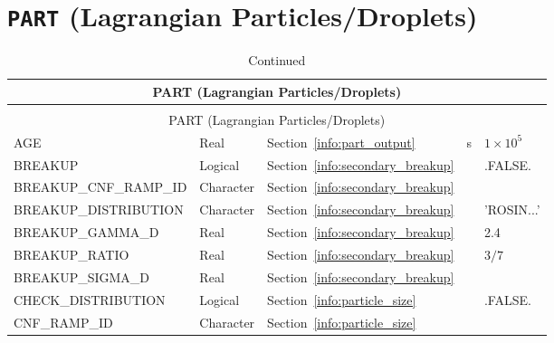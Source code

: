 \documentclass[11pt]{book}
\begin{document}
\vspace{\baselineskip}


\section{\texorpdfstring{{\tt PART}}{PART} (Lagrangian Particles/Droplets)}


\begin{longtable}{@{\extracolsep{\fill}}|l|l|l|l|l|}
\caption[Lagrangian particles ({\ct PART} namelist group)]{For more information see Chapter~\ref{info:PART}.}
\label{tbl:PART} \\
\hline
\multicolumn{5}{|c|}{{\ct PART} (Lagrangian Particles/Droplets)} \\
\hline \hline
\endfirsthead
\caption[]{Continued} \\
\hline
\multicolumn{5}{|c|}{{\ct PART} (Lagrangian Particles/Droplets)} \\
\hline \hline
\endhead
{\ct AGE}                                & Real            & Section~\ref{info:part_output}          & s         & $1\times 10^5$ \\ \hline
{\ct BREAKUP}                            & Logical         & Section~\ref{info:secondary_breakup}    &           & {\ct .FALSE.} \\ \hline
{\ct BREAKUP\_CNF\_RAMP\_ID}             & Character       & Section~\ref{info:secondary_breakup}    &           &               \\ \hline
{\ct BREAKUP\_DISTRIBUTION}              & Character       & Section~\ref{info:secondary_breakup}    &           & {\ct 'ROSIN...'} \\ \hline
{\ct BREAKUP\_GAMMA\_D}                  & Real            & Section~\ref{info:secondary_breakup}    &           & 2.4           \\ \hline
{\ct BREAKUP\_RATIO}                     & Real            & Section~\ref{info:secondary_breakup}    &           & $3/7$         \\ \hline
{\ct BREAKUP\_SIGMA\_D}                  & Real            & Section~\ref{info:secondary_breakup}    &           &               \\ \hline
{\ct CHECK\_DISTRIBUTION}                & Logical         & Section~\ref{info:particle_size}        &           & {\ct .FALSE.} \\ \hline
{\ct CNF\_RAMP\_ID}                      & Character       & Section~\ref{info:particle_size}        &           &               \\ \hline

\end{longtable}
\end{document}

